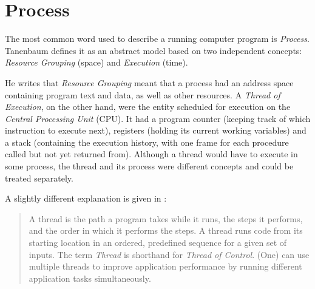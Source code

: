%
%
%
%
%
%
%

\section{Process}
\label{process_heading}

The most common word used to describe a running computer program is
\emph{Process}. Tanenbaum \cite{tanenbaum2001} defines it as an abstract model
based on two independent concepts: \emph{Resource Grouping} (space) and
\emph{Execution} (time).

He writes that \emph{Resource Grouping} meant that a process had an address
space containing program text and data, as well as other resources. A
\emph{Thread of Execution}, on the other hand, were the entity scheduled for
execution on the \emph{Central Processing Unit} (CPU). It had a program counter
(keeping track of which instruction to execute next), registers (holding its
current working variables) and a stack (containing the execution history, with
one frame for each procedure called but not yet returned from). Although a
thread would have to execute in some process, the thread and its process were
different concepts and could be treated separately.

A slightly different explanation is given in \cite{iseries}:

\begin{quote}
    A thread is the path a program takes while it runs, the steps it performs,
    and the order in which it performs the steps. A thread runs code from its
    starting location in an ordered, predefined sequence for a given set of
    inputs. The term \emph{Thread} is shorthand for \emph{Thread of Control}.
    (One) can use multiple threads to improve application performance by
    running different application tasks simultaneously.
\end{quote}

